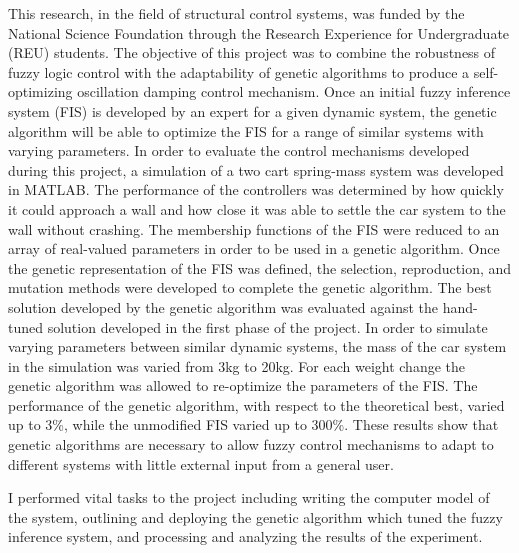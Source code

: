 \documentclass{article}
\begin{document}
	This research, in the field of structural control systems, was funded by the National Science
	Foundation through the Research Experience for Undergraduate (REU) students. The
	objective of this project was to combine the robustness of fuzzy logic control with the
	adaptability of genetic algorithms to produce a self-optimizing oscillation damping control
	mechanism. Once an initial fuzzy inference system (FIS) is developed by an expert for a
	given dynamic system, the genetic algorithm will be able to optimize the FIS for a range
	of similar systems with varying parameters. In order to evaluate the control mechanisms
	developed during this project, a simulation of a two cart spring-mass system was developed
	in MATLAB. The performance of the controllers was determined by how quickly it could
	approach a wall and how close it was able to settle the car system to the wall without
	crashing. The membership functions of the FIS were reduced to an array of real-valued
	parameters in order to be used in a genetic algorithm. Once the genetic representation of
	the FIS was defined, the selection, reproduction, and mutation methods were developed
	to complete the genetic algorithm. The best solution developed by the genetic algorithm
	was evaluated against the hand-tuned solution developed in the first phase of the project.
	In order to simulate varying parameters between similar dynamic systems, the mass of the
	car system in the simulation was varied from 3kg to 20kg. For each weight change the
	genetic algorithm was allowed to re-optimize the parameters of the FIS. The performance
	of the genetic algorithm, with respect to the theoretical best, varied up to 3\%, while the
	unmodified FIS varied up to 300\%. These results show that genetic algorithms are necessary
	to allow fuzzy control mechanisms to adapt to different systems with little external input
	from a general user.
	
	I performed vital tasks to the project including writing the computer model of the system, outlining and deploying the genetic algorithm which tuned the fuzzy inference system, and processing and analyzing the results of the experiment. 
\end{document}
